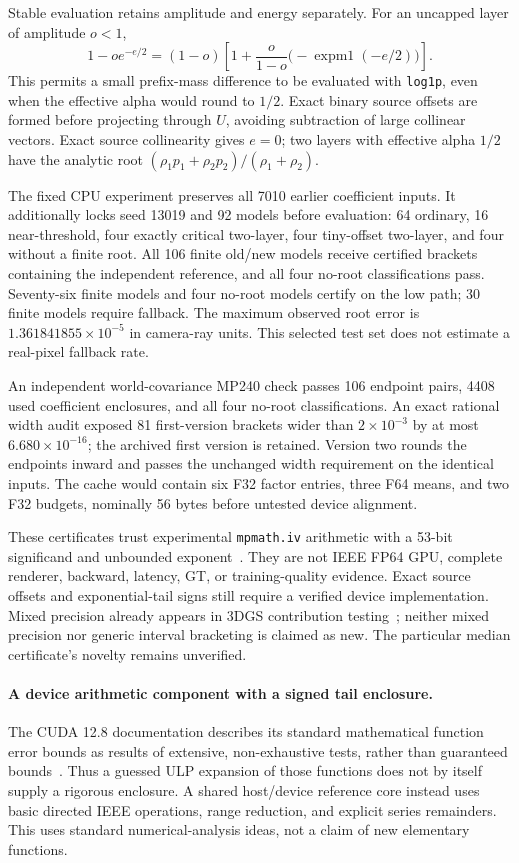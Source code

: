 \documentclass[11pt,a4paper]{article}
\begin{document}
Stable evaluation retains amplitude and energy separately. For an uncapped
layer of amplitude $o<1$,
\[
 1-o e^{-e/2}=(1-o)\left[1+\frac{o}{1-o}
       \bigl(-\operatorname{expm1}(-e/2)\bigr)\right].
\]
This permits a small prefix-mass difference to be evaluated with
\texttt{log1p}, even when the effective alpha would round to $1/2$.
Exact binary source offsets are formed before projecting through $U$,
avoiding subtraction of large collinear vectors. Exact source collinearity
gives $e=0$; two layers with effective alpha $1/2$ have the analytic root
$(\rho_1p_1+\rho_2p_2)/(\rho_1+\rho_2)$.

The fixed CPU experiment preserves all 7010 earlier coefficient inputs.
It additionally locks seed 13019 and 92 models before evaluation:
64 ordinary, 16 near-threshold, four exactly critical two-layer,
four tiny-offset two-layer, and four without a finite root.
All 106 finite old/new models receive certified brackets containing the
independent reference, and all four no-root classifications pass.
Seventy-six finite models and four no-root models certify on the low path;
30 finite models require fallback. The maximum observed root error is
$1.361841855\times10^{-5}$ in camera-ray units. This selected test set
does not estimate a real-pixel fallback rate.

An independent world-covariance MP240 check passes 106 endpoint pairs,
4408 used coefficient enclosures, and all four no-root classifications.
An exact rational width audit exposed 81 first-version brackets wider
than $2\times10^{-3}$ by at most $6.680\times10^{-16}$; the archived
first version is retained. Version two rounds the endpoints inward and
passes the unchanged width requirement on the identical inputs.
The cache would contain six F32 factor entries, three F64 means, and two
F32 budgets, nominally 56 bytes before untested device alignment.

These certificates trust experimental \texttt{mpmath.iv} arithmetic
with a 53-bit significand and unbounded exponent~\cite{mpmathiv}.
They are not IEEE FP64 GPU, complete renderer, backward, latency, GT,
or training-quality evidence. Exact source offsets and exponential-tail
signs still require a verified device implementation. Mixed precision
already appears in 3DGS contribution testing~\cite{flicker}; neither
mixed precision nor generic interval bracketing is claimed as new.
The particular median certificate's novelty remains unverified.

\paragraph{A device arithmetic component with a signed tail enclosure.}
The CUDA 12.8 documentation describes its standard mathematical function
error bounds as results of extensive, non-exhaustive tests, rather than
guaranteed bounds~\cite{cudamath}. Thus a guessed ULP expansion of those
functions does not by itself supply a rigorous enclosure. A shared
host/device reference core instead uses basic directed IEEE operations,
range reduction, and explicit series remainders. This uses standard
numerical-analysis ideas, not a claim of new elementary functions.
\end{document}

